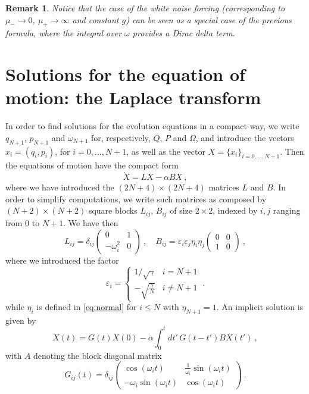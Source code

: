 \documentclass[11pt]{article}
\numberwithin{equation}{section}
\newtheorem{rmk}[theorem]{Remark}
\numberwithin{theorem}{section}
\newcommand{\e}{\varepsilon}
\begin{document}
\begin{rmk}\label{rmk:stoc_rumore_bianco}\emph{
Notice that the case of the white noise forcing (corresponding to $\mu_-\to 0$, $\mu_+\to \infty$ and constant $g$)
can be seen as a special case of the previous formula, where the integral over $\omega$ provides  a Dirac
delta term.}
\end{rmk}

 
\section{Solutions for the equation of motion: the Laplace transform}\label{sec:solution}
 
In order to find solutions for the evolution equations in a compact way, we write $q_{N+1}$, $p_{N+1}$ and
$\omega_{N+1}$ for, respectively, $Q$, $P$ and $\Omega$, and introduce the vectors $x_i=(q_i,p_i)$, for
$i=0,\ldots,N+1$, as well as the vector $X=\{x_i\}_{i=0,\ldots,N+1}$. Then the equations of motion have the compact
form
\begin{equation}\label{eq:evo}
\dot X= L X-\alpha  B X \ ,
\end{equation}
where we have introduced the $(2N+4)\times(2N+4)$ matrices $L$ and $B$. In order to simplify computations, we write such
matrices as composed by $(N+2)\times(N+2)$ square blocks $L_{ij}$, $B_{ij}$ of size $2\times 2$, indexed by $i,j$
ranging from  0 to $N+1$. We have then
\[
L_{ij}=\delta_{ij} \begin{pmatrix} 0 & 1\\
-\omega^2_i & 0 \end{pmatrix}\ ,\quad B_{ij}=\e_i\e_j\eta_i\eta_j
\begin{pmatrix} 0 & 0\\
1 & 0 \end{pmatrix}\ ,
\]
where we introduced the factor
\[
\e_i=\left\{\begin{array}{cc}1/\sqrt \gamma & i=N+1\\
-\sqrt{\frac{\gamma}{N}}& i\neq N+1\end{array}\right.\ .
\]
while $\eta_i$ is defined in \eqref{eq:normal} for $i\leq N$ with $\eta_{N+1}=1$. An implicit solution is given by
\begin{equation}\label{eq:impl}
X(t) = G(t) X(0) -\alpha\int_0^t dt'\,G(t-t')
B X(t')\ ,
\end{equation}
with $A$ denoting the block diagonal matrix
\[
G_{ij}(t) = \delta_{ij} \begin{pmatrix} \cos(\omega_i t) &
\frac{1}{\omega_i}\sin(\omega_i t)\\
-\omega_i \sin(\omega_i t)& \cos(\omega_i t) \end{pmatrix}\ .
\]
\end{document}
